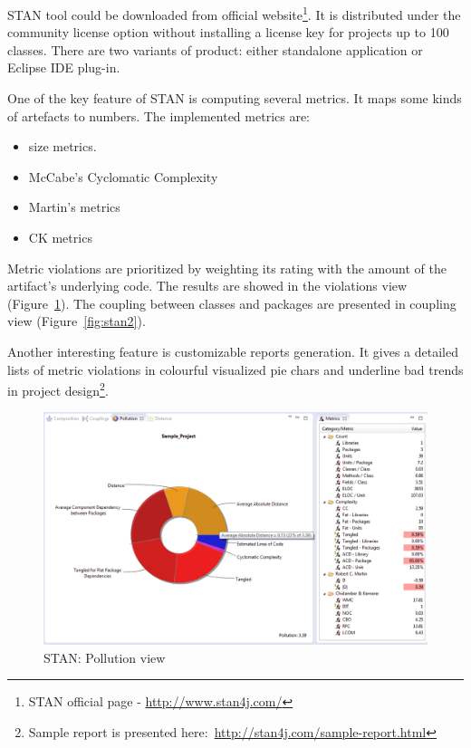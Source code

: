 STAN tool could be downloaded from official website\footnote{STAN official page - \url{http://www.stan4j.com/}}. It is distributed under the community license option without installing a license key for projects up to 100 classes. There are two variants of product: either standalone application or Eclipse IDE plug-in.

One of the key feature of STAN is computing several metrics. It maps some kinds of artefacts to numbers. The implemented metrics are:

\begin{itemize}
\item size metrics.
\item McCabe's Cyclomatic Complexity
\item Martin's metrics
\item \ac{CK metrics}
\end{itemize}

Metric violations are prioritized  by weighting its rating with the amount of the artifact's underlying code. The results are showed in the violations view (Figure~\ref{fig:stan}). The coupling between classes and packages are presented in coupling view (Figure~\ref{fig:stan2}).

Another interesting feature is customizable reports generation. It gives a detailed lists of metric violations in colourful visualized pie chars and underline bad trends in project design\footnote{Sample report is presented here:~\url{http://stan4j.com/sample-report.html}}\cite{stan}.

\begin{figure}[h!]
	\centering
	\includegraphics[scale=0.55]{img/stan.png} 
	\caption{STAN: Pollution view}		
	\label{fig:stan}
\end{figure}


